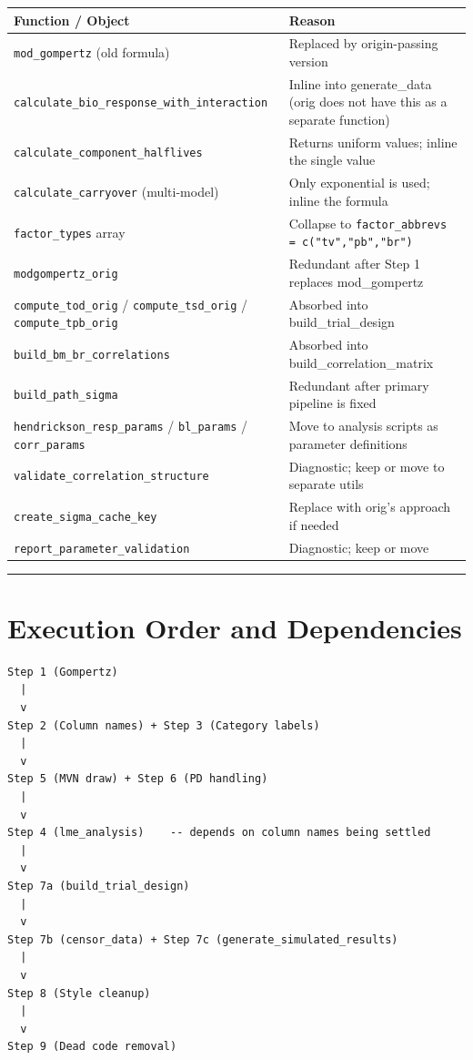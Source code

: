 \documentclass[11pt]{article}
\begin{document}
\begin{table}[h]
\centering
\small
\begin{tabular}{lp{8cm}}
\toprule
Function / Object & Reason \\
\midrule
\texttt{mod\_gompertz} (old formula) & Replaced by origin-passing version \\
\texttt{calculate\_bio\_response\_with\_interaction} & Inline into generate\_data (orig does not have this as a separate function) \\
\texttt{calculate\_component\_halflives} & Returns uniform values; inline the single value \\
\texttt{calculate\_carryover} (multi-model) & Only exponential is used; inline the formula \\
\texttt{factor\_types} array & Collapse to \texttt{factor\_abbrevs = c("tv","pb","br")} \\
\texttt{modgompertz\_orig} & Redundant after Step 1 replaces mod\_gompertz \\
\texttt{compute\_tod\_orig} / \texttt{compute\_tsd\_orig} / \texttt{compute\_tpb\_orig} & Absorbed into build\_trial\_design \\
\texttt{build\_bm\_br\_correlations} & Absorbed into build\_correlation\_matrix \\
\texttt{build\_path\_sigma} & Redundant after primary pipeline is fixed \\
\texttt{hendrickson\_resp\_params} / \texttt{bl\_params} / \texttt{corr\_params} & Move to analysis scripts as parameter definitions \\
\texttt{validate\_correlation\_structure} & Diagnostic; keep or move to separate utils \\
\texttt{create\_sigma\_cache\_key} & Replace with orig's approach if needed \\
\texttt{report\_parameter\_validation} & Diagnostic; keep or move \\
\bottomrule
\end{tabular}
\end{table}

\bigskip\noindent\rule{\textwidth}{0.4pt}\bigskip

\section{Execution Order and Dependencies}

\begin{verbatim}
Step 1 (Gompertz)
  |
  v
Step 2 (Column names) + Step 3 (Category labels)
  |
  v
Step 5 (MVN draw) + Step 6 (PD handling)
  |
  v
Step 4 (lme_analysis)    -- depends on column names being settled
  |
  v
Step 7a (build_trial_design)
  |
  v
Step 7b (censor_data) + Step 7c (generate_simulated_results)
  |
  v
Step 8 (Style cleanup)
  |
  v
Step 9 (Dead code removal)
\end{verbatim}
\end{document}
